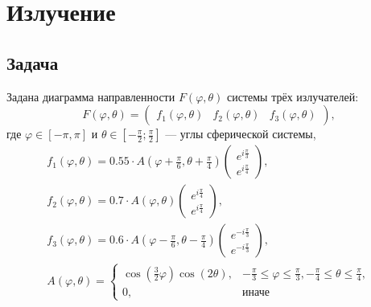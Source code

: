 \documentclass[a4paper,12pt]{article}
\begin{document}
\section{Излучение}

\subsection{Задача}

Задана диаграмма направленности $F(\varphi, \theta)$ системы трёх излучателей:
\[
    F(\varphi, \theta)
    = \begin{pmatrix}
        f_1(\varphi, \theta) & f_2(\varphi, \theta) & f_3(\varphi, \theta)
    \end{pmatrix} ,
\]
где $\varphi \in [ -\pi, \pi]$ и $\theta \in \left[ -\frac{\pi}{2} ; \frac{\pi}{2} \right]$ --- углы сферической системы,
\begin{gather*}
    f_1(\varphi, \theta) =
    0.55 \cdot A \left( \varphi + \frac{\pi}{6}, \theta + \frac{\pi}{4} \right)
    \begin{pmatrix}
        e^{i \frac{\pi}{3}} \\
        e^{i \frac{\pi}{4}}
    \end{pmatrix}, \\
    f_2(\varphi, \theta) =
    0.7 \cdot A \left( \varphi, \theta \right)
    \begin{pmatrix}
        e^{i \frac{\pi}{4}} \\
        e^{i \frac{\pi}{4}}
    \end{pmatrix}, \\
    f_3(\varphi, \theta) =
    0.6 \cdot A \left( \varphi - \frac{\pi}{6}, \theta - \frac{\pi}{4} \right)
    \begin{pmatrix}
        e^{-i \frac{\pi}{3}} \\
        e^{-i \frac{\pi}{3}}
    \end{pmatrix} , \\
    A \left( \varphi, \theta \right)
    =
    \left \{
    \begin{array}{ll}
        \cos \left( \frac{3}{2} \varphi \right) \cos \left( 2 \theta \right), & -\frac{\pi}{3} \le \varphi \le \frac{\pi}{3}, -\frac{\pi}{4} \le \theta \le \frac{\pi}{4}, \\
        0,                                                                    & \text{иначе}
    \end{array}
    \right .
\end{gather*}
\end{document}
